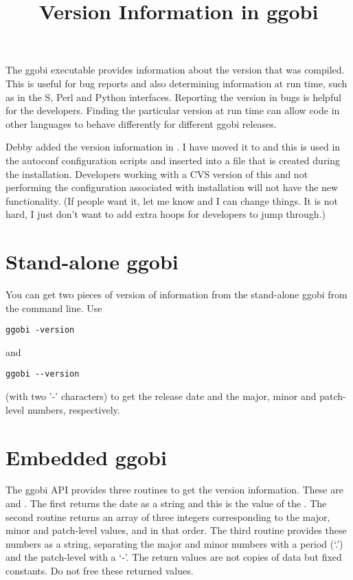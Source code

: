 \documentclass{article}
\title{Version Information in ggobi}
\begin{document}
\maketitle
The ggobi executable provides information about the version that was
compiled. This is useful for bug reports and also determining
information at run time, such as in the S, Perl and Python interfaces.
Reporting the version in bugs is helpful for the developers.  Finding
the particular version at run time can allow code in other languages
to behave differently for different ggobi releases.

Debby added the version information in .  I have moved
it to  and this is used in the autoconf
configuration scripts and inserted into a file  that is
created during the installation.  Developers working with a CVS
version of this and not performing the configuration associated with
installation will not have the new functionality. (If people want it,
let me know and I can change things.  It is not hard, I just don't
want to add extra hoops for developers to jump through.)

\section{Stand-alone ggobi}
You can get two pieces of version of information
from the stand-alone ggobi from the command line.
Use 
\begin{verbatim}
ggobi -version
\end{verbatim}
and
\begin{verbatim}
ggobi --version
\end{verbatim}
(with two '-' characters) to get the release date and the major, minor
and patch-level numbers, respectively.

\section{Embedded ggobi}

The ggobi API provides three routines to get the version information.
These are  and
.  The first returns the date as a
string and this is the value of the .
The second routine returns an array of three integers corresponding to
the major, minor and patch-level values, and in that order.  The third
routine provides these numbers as a string, separating the major and
minor numbers with a period (`.') and the patch-level with a `-'.  The
return values are not copies of data but fixed constants. Do not free
these returned values.
\end{document}
